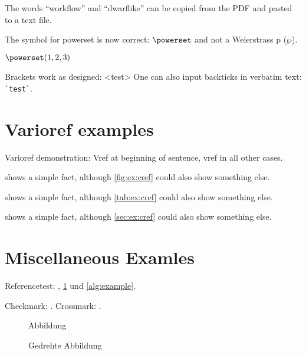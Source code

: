 \documentclass[
  numbers=noenddot,
  english,  %
  a4paper,  %
  twoside,  %
  bibliography=totoc,
  headsepline,
  cleardoublepage=empty,
  parskip=half,
  draft=false
]{scrbook}
\theoremstyle{break}
\newcommand{\dingcheck}{\ding{51}}
\newcommand{\dingcross}{\ding{55}}
\begin{document}
\begin{ltgexample}
The words \enquote{workflow} and \enquote{dwarflike} can be copied from the PDF and pasted to a text file.
\end{ltgexample}

\begin{ltgexample}
The symbol for powerset is now correct: $\powerset$ and not a Weierstrass p ($\wp$).

$\powerset({1,2,3})$
\end{ltgexample}

\begin{ltgexample}
Brackets work as designed:
<test>
One can also input backticks in verbatim text: \verb|`test`|.
\end{ltgexample}


\section{Varioref examples}
\label{sec:ex:vref}

Varioref demonstration: Vref at beginning of sentence, vref in all other cases.

\begin{ltgexample}
 shows a simple fact, although \vref{fig:ex:cref} could also show something else.

 shows a simple fact, although \vref{tab:ex:cref} could also show something else.

 shows a simple fact, although \vref{sec:ex:cref} could also show something else.
\end{ltgexample}
\section{Miscellaneous Examles}
\label{ssec:example}

Referencetest: , \cref{fig:Abbildung} und \cref{alg:example}.

\begin{ltgexample}
Checkmark: \dingcheck.
Crossmark: \dingcross.
\end{ltgexample}

\begin{figure}
  \missingfigure{}
  \caption{Abbildung}
  \label{fig:Abbildung}
\end{figure}

\begin{landscape}
  \begin{figure}
    \missingfigure{}
    \caption{Gedrehte Abbildung}
    \label{fig:AbbildungGedreht}
  \end{figure}
\end{landscape}
\end{document}
